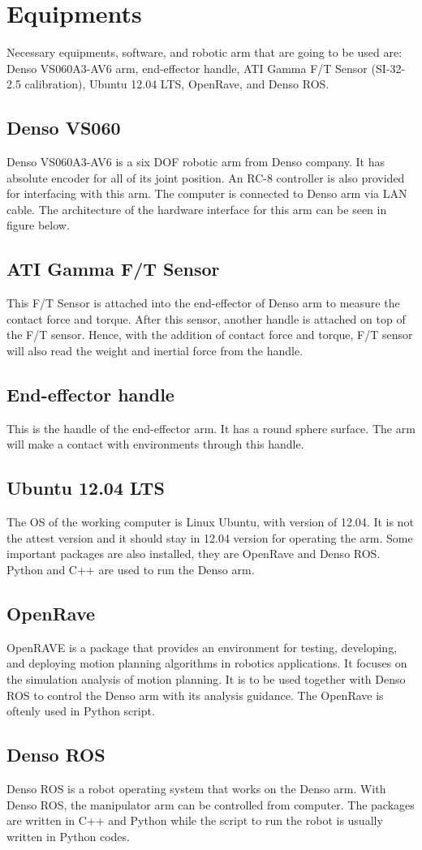 \chapter{Equipments}

Necessary equipments, software, and robotic arm that are going to be used are: Denso VS060A3-AV6 arm, end-effector handle, ATI Gamma F/T Sensor (SI-32-2.5 calibration), Ubuntu 12.04 LTS, OpenRave, and Denso ROS. 

\section{Denso VS060}
Denso VS060A3-AV6 is a six DOF robotic arm from Denso company. It has absolute encoder for all of its joint position.  An RC-8 controller is also provided for interfacing with this arm. The computer is connected to Denso arm via LAN cable. The architecture of the hardware interface for this arm can be seen in figure below.

\section{ATI Gamma F/T Sensor}
This F/T Sensor is attached into the end-effector of Denso arm to measure the contact force and torque. After this sensor, another handle is attached on top of the F/T sensor. Hence, with the addition of contact force and torque, F/T sensor will also read the weight and inertial force from the handle. 

\section{End-effector handle}
This is the handle of the end-effector arm. It has a round sphere surface. The arm will make a contact with environments through this handle.

\section{Ubuntu 12.04 LTS}
The OS of the working computer is Linux Ubuntu, with version of 12.04. It is not the attest version and it should stay in 12.04 version for operating the arm. Some important packages are also installed, they are OpenRave and Denso ROS. Python and C++ are used to run the Denso arm.

\section{OpenRave}
OpenRAVE is a package that provides an environment for testing, developing, and deploying motion planning algorithms in robotics applications. It focuses on the simulation analysis of motion planning. It is to be used together with Denso ROS to control the Denso arm with its analysis guidance. The OpenRave is oftenly used in Python script.
  
\section{Denso ROS}
Denso ROS is a robot operating system that works on the Denso arm. With Denso ROS, the manipulator arm can be controlled from computer. The packages are written in C++ and Python while the script to run the robot is usually written in Python codes.
